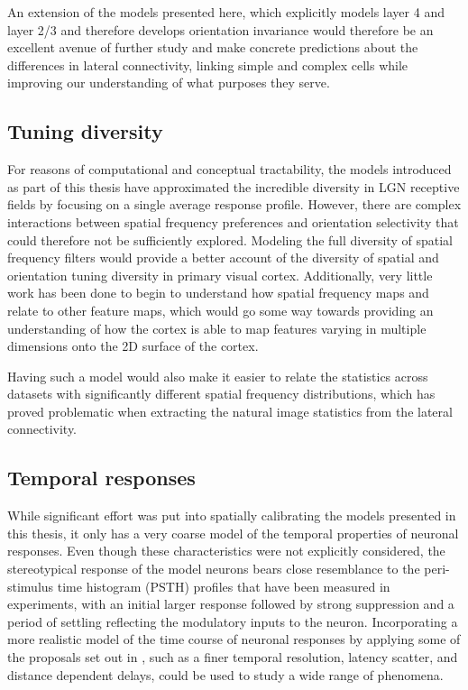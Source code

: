 An extension of the models presented here, which explicitly models
layer 4 and layer 2/3 and therefore develops orientation invariance
would therefore be an excellent avenue of further study and make
concrete predictions about the differences in lateral connectivity,
linking simple and complex cells while improving our understanding of
what purposes they serve.

\subsection{Tuning diversity}

For reasons of computational and conceptual tractability, the models
introduced as part of this thesis have approximated the incredible
diversity in LGN receptive fields by focusing on a single average
response profile. However, there are complex interactions between spatial
frequency preferences and orientation selectivity that could therefore
not be sufficiently explored. Modeling the full diversity of spatial
frequency filters would provide a better account of the diversity of
spatial and orientation tuning diversity in primary visual
cortex. Additionally, very little work has been done to begin to
understand how spatial frequency maps and relate to other feature
maps, which would go some way towards providing an understanding of
how the cortex is able to map features varying in multiple dimensions
onto the 2D surface of the cortex.

Having such a model would also make it easier to relate the statistics
across datasets with significantly different spatial frequency
distributions, which has proved problematic when extracting the
natural image statistics from the lateral connectivity.

\subsection{Temporal responses}

While significant effort was put into spatially calibrating the models
presented in this thesis, it only has a very coarse model of the
temporal properties of neuronal responses. Even though these
characteristics were not explicitly considered, the stereotypical
response of the model neurons bears close resemblance to the
peri-stimulus time histogram (PSTH) profiles that have been measured
in experiments, with an initial larger response followed by strong
suppression and a period of settling reflecting the modulatory inputs
to the neuron. Incorporating a more realistic model of the time course
of neuronal responses by applying some of the proposals set out in
\cite{Stevens2016}, such as a finer temporal resolution, latency
scatter, and distance dependent delays, could be used to study a wide
range of phenomena.

